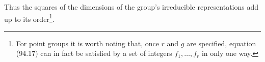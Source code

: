 Thus the squares of the dimensions of the group's irreducible representations add up to its order\footnote{For point groups it is worth noting that, once $r$ and $g$ are specified, equation (94.17) can in fact be satisfied by a set of integers $f_1,\ldots,f_r$ in only one way.}.
